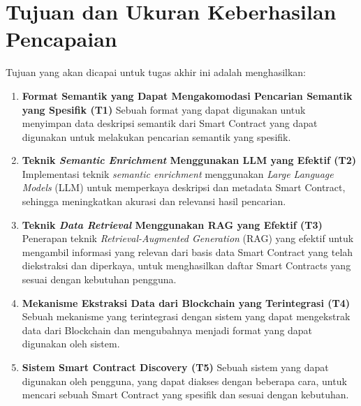 \section{Tujuan dan Ukuran Keberhasilan Pencapaian}
\label{sec:tujuan-ukuran-keberhasilan-pencapaian}


Tujuan yang akan dicapai untuk tugas akhir ini adalah menghasilkan: 

\begin{enumerate}
  \item \textbf{Format Semantik yang Dapat Mengakomodasi Pencarian Semantik yang Spesifik (T1)} \newline
  Sebuah format yang dapat digunakan untuk menyimpan data deskripsi semantik dari Smart Contract yang dapat digunakan untuk melakukan pencarian semantik yang spesifik. 

  \item \textbf{Teknik \textit{Semantic Enrichment} Menggunakan LLM yang Efektif (T2)} \newline
  Implementasi teknik \textit{semantic enrichment} menggunakan \textit{Large Language Models} (LLM) untuk memperkaya deskripsi dan metadata Smart Contract, sehingga meningkatkan akurasi dan relevansi hasil pencarian.

  \item \textbf{Teknik \textit{Data Retrieval} Menggunakan RAG yang Efektif (T3)} \newline
  Penerapan teknik \textit{Retrieval-Augmented Generation} (RAG) yang efektif untuk mengambil informasi yang relevan dari basis data Smart Contract yang telah diekstraksi dan diperkaya, untuk menghasilkan daftar Smart Contracts yang sesuai dengan kebutuhan pengguna.

  \item \textbf{Mekanisme Ekstraksi Data dari Blockchain yang Terintegrasi (T4)} \newline
  Sebuah mekanisme yang terintegrasi dengan sistem yang dapat mengekstrak data dari Blockchain dan mengubahnya menjadi format yang dapat digunakan oleh sistem.

  \item \textbf{Sistem Smart Contract Discovery (T5)} \newline
  Sebuah sistem yang dapat digunakan oleh pengguna, yang dapat diakses dengan beberapa cara, untuk mencari sebuah Smart Contract yang spesifik dan sesuai dengan kebutuhan.
  
\end{enumerate}

